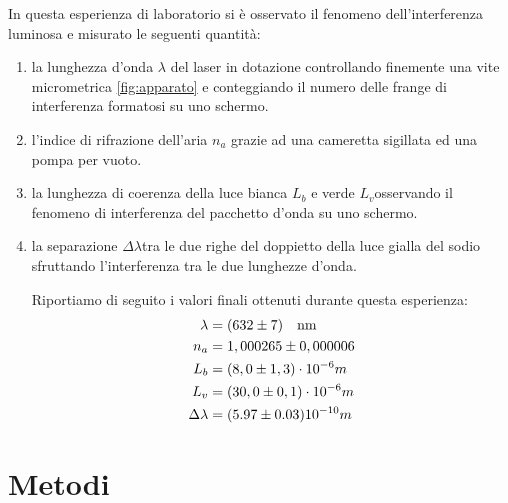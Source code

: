 \documentclass{article}
\begin{document}
In questa esperienza di laboratorio si è osservato il fenomeno dell'interferenza luminosa e misurato le seguenti quantità:
\begin{enumerate}
    \item la lunghezza d'onda $\lambda$ del laser in dotazione controllando finemente una vite micrometrica \ref{fig:apparato} e conteggiando il numero delle frange di interferenza formatosi su uno schermo.
    \item l'indice di rifrazione dell'aria $n_a$ grazie ad una cameretta sigillata ed una pompa per vuoto.
    \item la lunghezza di coerenza  della luce bianca $L_b$ e verde $L_v$osservando il fenomeno di interferenza del pacchetto d'onda su uno schermo.
    \item la separazione $\Delta\lambda$tra le due righe del doppietto della luce gialla del sodio sfruttando l'interferenza tra le due lunghezze d'onda.

    Riportiamo di seguito i valori finali ottenuti durante questa esperienza:
    \begin{align*}
         \lambda &= (632 \pm 7) \qq{nm}\\
         n_a &= 1,000265 \pm 0,000006 \\
        L_b &= (8,0 \pm 1,3)\cdot 10^{-6} m\\
        L_v &= (30,0 \pm 0,1)\cdot 10^{-6} m\\ 
         \Delta\lambda &= (5.97 \pm 0.03)10^{-10} m
    \end{align*}
    
\end{enumerate}


\section{Metodi}
\end{document}
